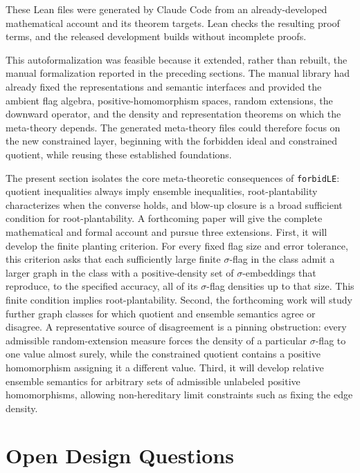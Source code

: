 \documentclass{article}
\newcommand{\lean}[1]{\texttt{#1}}
\begin{document}
These Lean files were generated by Claude Code from an already-developed
mathematical account and its theorem targets.  Lean checks the resulting proof
terms, and the released development builds without incomplete proofs.

This autoformalization was feasible because it extended, rather than rebuilt,
the manual formalization reported in the preceding sections.  The manual
library had already fixed the representations and semantic interfaces and
provided the ambient flag algebra, positive-homomorphism spaces, random
extensions, the downward operator, and the density and representation
theorems on which the meta-theory depends.  The generated meta-theory files
could therefore focus on the new constrained layer, beginning with the
forbidden ideal and constrained quotient, while reusing these established
foundations.

The present section isolates the core meta-theoretic consequences of
\lean{forbidLE}: quotient inequalities always imply ensemble inequalities,
root-plantability characterizes when the converse holds, and blow-up closure
is a broad sufficient condition for root-plantability.  A forthcoming paper
will give the complete mathematical and formal account and pursue three
extensions.  First, it will develop the finite planting criterion.  For every
fixed flag size and error tolerance, this criterion asks that each sufficiently
large finite \(\sigma\)-flag in the class admit a larger graph in the class
with a positive-density set of \(\sigma\)-embeddings that reproduce, to the
specified accuracy, all of its \(\sigma\)-flag densities up to that size.
This finite condition implies root-plantability.  Second, the forthcoming
work will study further graph classes for which quotient and ensemble
semantics agree or disagree.  A representative source of disagreement is a
pinning obstruction: every admissible random-extension measure forces the
density of a particular \(\sigma\)-flag to one value almost surely, while the
constrained quotient contains a positive homomorphism assigning it a
different value.  Third, it will develop relative ensemble semantics for
arbitrary sets of admissible unlabeled positive homomorphisms, allowing
non-hereditary limit constraints such as fixing the edge density.


\section{Open Design Questions}
\label{sec:unsure}
\end{document}
